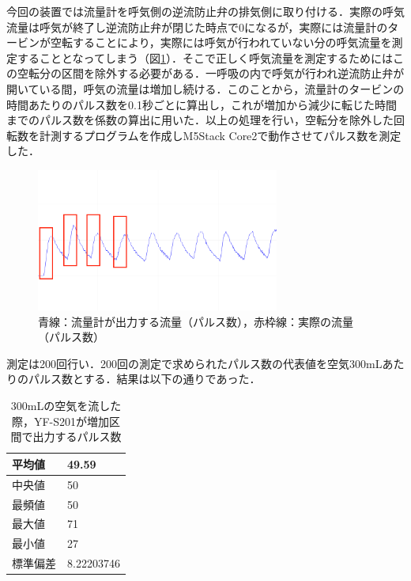 今回の装置では流量計を呼気側の逆流防止弁の排気側に取り付ける．実際の呼気流量は呼気が終了し逆流防止弁が閉じた時点で0になるが，実際には流量計のタービンが空転することにより，実際には呼気が行われていない分の呼気流量を測定することとなってしまう（図\ref{fig:flowsensor_increased_section}）．そこで正しく呼気流量を測定するためにはこの空転分の区間を除外する必要がある．一呼吸の内で呼気が行われ逆流防止弁が開いている間，呼気の流量は増加し続ける．このことから，流量計のタービンの時間あたりのパルス数を0.1秒ごとに算出し，これが増加から減少に転じた時間までのパルス数を係数の算出に用いた．以上の処理を行い，空転分を除外した回転数を計測するプログラムを作成しM5Stack Core2で動作させてパルス数を測定した．

\begin{figure}[H]
  \begin{center}
    \includegraphics[width=8cm]{fig/flowsensor_increased_section}
    \caption{青線：流量計が出力する流量（パルス数），赤枠線：実際の流量（パルス数）}
    \label{fig:flowsensor_increased_section}
  \end{center}
\end{figure}

測定は200回行い．200回の測定で求められたパルス数の代表値を空気300mLあたりのパルス数とする．結果は以下の通りであった．

\begin{table}[H]
\begin{center}
\begin{tabular}{|l|l|}
\hline
平均値  & 49.59      \\ \hline
中央値  & 50         \\ \hline
最頻値  & 50         \\ \hline
最大値  & 71         \\ \hline
最小値  & 27         \\ \hline
標準偏差 & 8.22203746 \\ \hline
\end{tabular}
\caption{300mLの空気を流した際，YF-S201が増加区間で出力するパルス数}
\label{tb:flowsensor_result}
\end{center}
\end{table}

